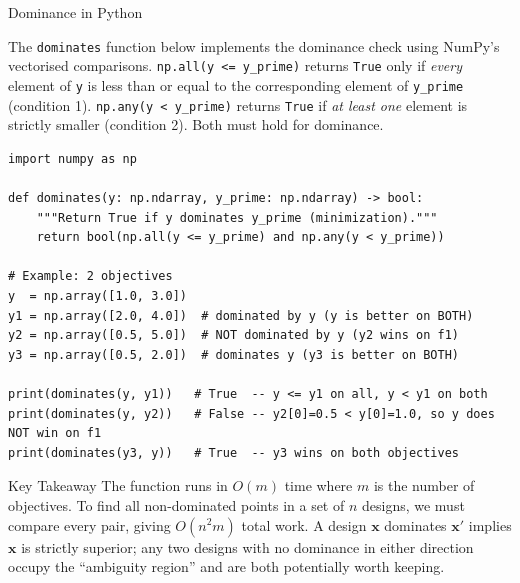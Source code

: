 \documentclass[aspectratio=169,10pt]{beamer}
\newcommand{\bx}{\mathbf{x}}
\begin{document}
\begin{frame}[fragile]{Dominance in Python}

The \texttt{dominates} function below implements the dominance check using
NumPy's vectorised comparisons.  \texttt{np.all(y <= y\_prime)} returns
\texttt{True} only if \emph{every} element of \texttt{y} is less than or
equal to the corresponding element of \texttt{y\_prime} (condition 1).
\texttt{np.any(y < y\_prime)} returns \texttt{True} if \emph{at least one}
element is strictly smaller (condition 2).  Both must hold for dominance.

\begin{lstlisting}
import numpy as np

def dominates(y: np.ndarray, y_prime: np.ndarray) -> bool:
    """Return True if y dominates y_prime (minimization)."""
    return bool(np.all(y <= y_prime) and np.any(y < y_prime))

# Example: 2 objectives
y  = np.array([1.0, 3.0])
y1 = np.array([2.0, 4.0])  # dominated by y (y is better on BOTH)
y2 = np.array([0.5, 5.0])  # NOT dominated by y (y2 wins on f1)
y3 = np.array([0.5, 2.0])  # dominates y (y3 is better on BOTH)

print(dominates(y, y1))   # True  -- y <= y1 on all, y < y1 on both
print(dominates(y, y2))   # False -- y2[0]=0.5 < y[0]=1.0, so y does NOT win on f1
print(dominates(y3, y))   # True  -- y3 wins on both objectives
\end{lstlisting}

\begin{block}{Key Takeaway}
  The function runs in $O(m)$ time where $m$ is the number of objectives.
  To find all non-dominated points in a set of $n$ designs, we must compare
  every pair, giving $O(n^2 m)$ total work.  A design $\bx$ dominates
  $\bx'$ implies $\bx$ is strictly superior; any two designs with no
  dominance in either direction occupy the ``ambiguity region'' and are
  both potentially worth keeping.
\end{block}

\end{frame}
\end{document}
